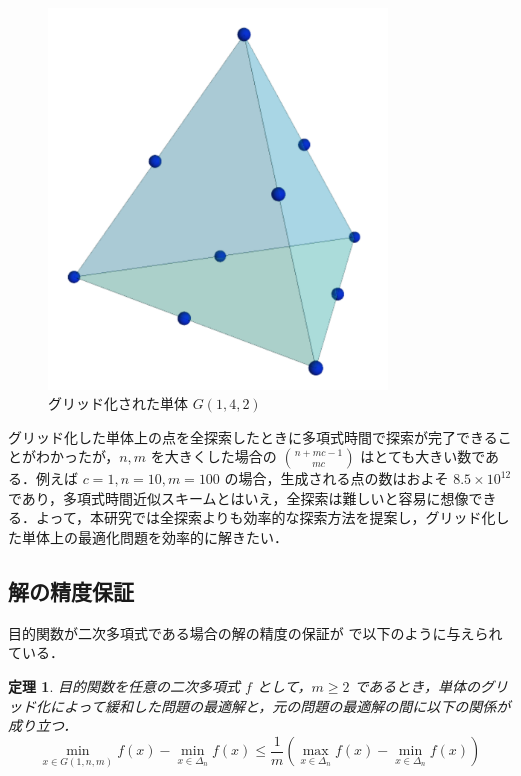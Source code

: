 \documentclass[a4paper,11pt]{jreport}
\newtheorem{theorem}{定理}
\begin{document}
\begin{figure}
\begin{center}
\includegraphics[width=9cm]{graphs/grid_simplex.pdf}
\caption{グリッド化された単体 $ G(1, 4, 2) $}
\label{fig:grid_simplex}
\end{center}
\end{figure}

グリッド化した単体上の点を全探索したときに多項式時間で探索が完了できることがわかったが，$ n, m $ を大きくした場合の $ \binom{n + mc - 1}{mc} $ はとても大きい数である．例えば $ c = 1, n = 10, m = 100 $ の場合，生成される点の数はおよそ $ 8.5 \times 10^{12} $ であり，多項式時間近似スキームとはいえ，全探索は難しいと容易に想像できる．よって，本研究では全探索よりも効率的な探索方法を提案し，グリッド化した単体上の最適化問題を効率的に解きたい．\par

\subsection{解の精度保証} \label{sec:rate_accuracy}

目的関数が二次多項式である場合の解の精度の保証が \cite{bomze} で以下のように与えられている．

\begin{theorem} \label{thm:quad_approximation}
目的関数を任意の二次多項式 $ f $ として，$ m \geq 2 $ であるとき，単体のグリッド化によって緩和した問題の最適解と，元の問題の最適解の間に以下の関係が成り立つ．
$$ \min_{x \in G(1, n, m)} f(x) - \min_{x \in \Delta_n} f(x) \leq \frac{1}{m} \left( \max_{x \in \Delta_n} f(x) - \min_{x \in \Delta_n} f(x) \right) $$
\end{theorem}
\end{document}
